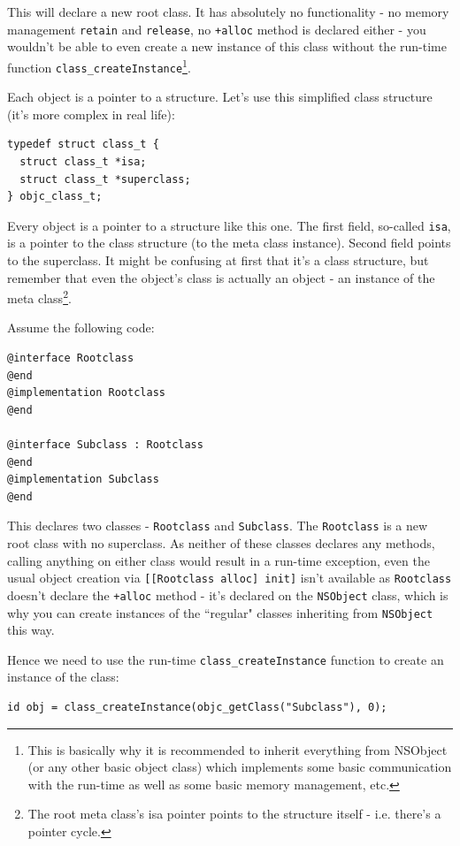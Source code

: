 \documentclass[a4paper, 11pt, fleqn]{book}
\begin{document}
This will declare a new root class. It has absolutely no functionality - no memory management \verb=retain= and \verb=release=, no \verb=+alloc= method is declared either - you wouldn't be able to even create a new instance of this class without the run-time function \verb=class_createInstance=\footnote{This is basically why it is recommended to inherit everything from NSObject (or any other basic object class) which implements some basic communication with the run-time as well as some basic memory management, etc.}.

Each object is a pointer to a structure. Let's use this simplified class structure (it's more complex in real life):

\begin{verbatim}
typedef struct class_t {
  struct class_t *isa;
  struct class_t *superclass;
} objc_class_t;
\end{verbatim}

Every object is a pointer to a structure like this one. The first field, so-called \verb=isa=, is a pointer to the class structure (to the meta class instance). Second field points to the superclass. It might be confusing at first that it's a class structure, but remember that even the object's class is actually an object - an instance of the meta class\footnote{The root meta class's isa pointer points to the structure itself - i.e. there's a pointer cycle.}.

Assume the following code:
\begin{verbatim}@interface Rootclass
@end
@implementation Rootclass
@end

@interface Subclass : Rootclass
@end
@implementation Subclass
@end 
\end{verbatim}

This declares two classes - \verb=Rootclass= and \verb=Subclass=. The \verb=Rootclass= is a new root class with no superclass. As neither of these classes declares any methods, calling anything on either class would result in a run-time exception, even the usual object creation via \verb=[[Rootclass alloc] init]= isn't available as \verb=Rootclass= doesn't declare the \verb=+alloc= method - it's declared on the \verb=NSObject= class, which is why you can create instances of the ``regular" classes inheriting from \verb=NSObject= this way.

Hence we need to use the run-time \verb=class_createInstance= function to create an instance of the class: 
\begin{verbatim}
id obj = class_createInstance(objc_getClass("Subclass"), 0);
\end{verbatim}
\end{document}
